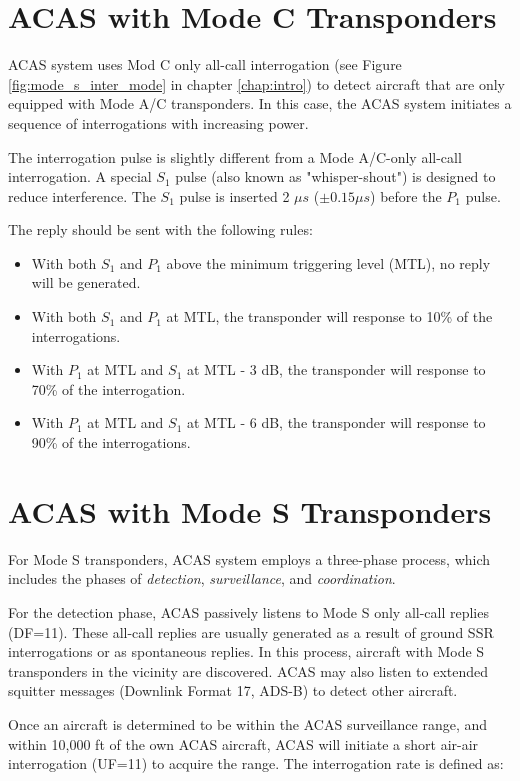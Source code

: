 \section{ACAS with Mode C Transponders}

ACAS system uses Mod C only all-call interrogation (see Figure \ref{fig:mode_s_inter_mode} in chapter \ref{chap:intro}) to detect aircraft that are only equipped with Mode A/C transponders. In this case, the ACAS system initiates a sequence of interrogations with increasing power.

The interrogation pulse is slightly different from a Mode A/C-only all-call interrogation. A special $S_1$ pulse (also known as "whisper-shout") is designed to reduce interference. The $S_1$ pulse is inserted 2 $\mu s$ ($\pm 0.15 \mu s$) before the $P_1$ pulse.

The reply should be sent with the following rules:

\begin{itemize}
  \item With both $S_1$ and $P_1$ above the minimum triggering level (MTL), no reply will be generated.
  \item With both $S_1$ and $P_1$ at MTL, the transponder will response to 10\% of the interrogations.
  \item With $P_1$ at MTL and $S_1$ at MTL - 3 dB, the transponder will response to 70\% of the interrogation.
  \item With $P_1$ at MTL and $S_1$ at MTL - 6 dB, the transponder will response to 90\% of the interrogations.
\end{itemize}

\section{ACAS with Mode S Transponders}

For Mode S transponders, ACAS system employs a three-phase process, which includes the phases of \emph{detection}, \emph{surveillance}, and \emph{coordination}.

For the detection phase, ACAS passively listens to Mode S only all-call replies (DF=11). These all-call replies are usually generated as a result of ground SSR interrogations or as spontaneous replies. In this process, aircraft with Mode S transponders in the vicinity are discovered. ACAS may also listen to extended squitter messages (Downlink Format 17, ADS-B) to detect other aircraft.

Once an aircraft is determined to be within the ACAS surveillance range, and within 10,000 ft of the own ACAS aircraft, ACAS will initiate a short air-air interrogation (UF=11) to acquire the range. The interrogation rate is defined as:


